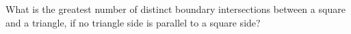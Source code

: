What is the greatest number of distinct boundary intersections between a square and a triangle, if no triangle side is parallel to a square side?
